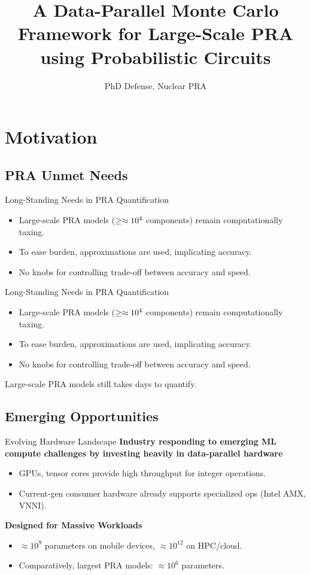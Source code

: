 \title{A Data-Parallel Monte Carlo Framework for Large-Scale PRA
using Probabilistic Circuits}
\subtitle{PhD Defense, Nuclear PRA}

\section{Motivation}
\subsection{PRA Unmet Needs}
\begin{frame}[t]{Long-Standing Needs in PRA Quantification}
  \begin{itemize}
    \item Large-scale PRA models ($\geq\space\approx10^4$ components) remain computationally taxing.
    \item To ease burden, approximations are used, implicating accuracy.
    \item No knobs for controlling trade-off between accuracy and speed.
  \end{itemize}
\end{frame}

\begin{frame}[t]{Long-Standing Needs in PRA Quantification}
  \begin{itemize}
    \item Large-scale PRA models ($\geq\space\approx10^4$ components) remain computationally taxing.
    \item To ease burden, approximations are used, implicating accuracy.
    \item No knobs for controlling trade-off between accuracy and speed.
  \end{itemize}
    \vspace{16pt}
    Large-scale PRA models still takes days to quantify.
\end{frame}

\subsection{Emerging Opportunities}
\begin{frame}[t]{Evolving Hardware Landscape}
\textbf{Industry responding to emerging ML compute challenges by investing heavily in data-parallel hardware}
  \begin{itemize} 
    \item GPUs, tensor cores provide high throughput for integer operations.
    \item Current-gen consumer hardware already supports specialized ops (Intel AMX, VNNI).
  \end{itemize}
  \vspace{8pt}
\textbf{Designed for Massive Workloads}
  \begin{itemize} 
    \item $\approx10^9$ parameters on mobile devices, $\approx10^{12}$ on HPC/cloud.
    \item Comparatively, largest PRA models: $\approx10^6$ parameters.
  \end{itemize}
\end{frame}

